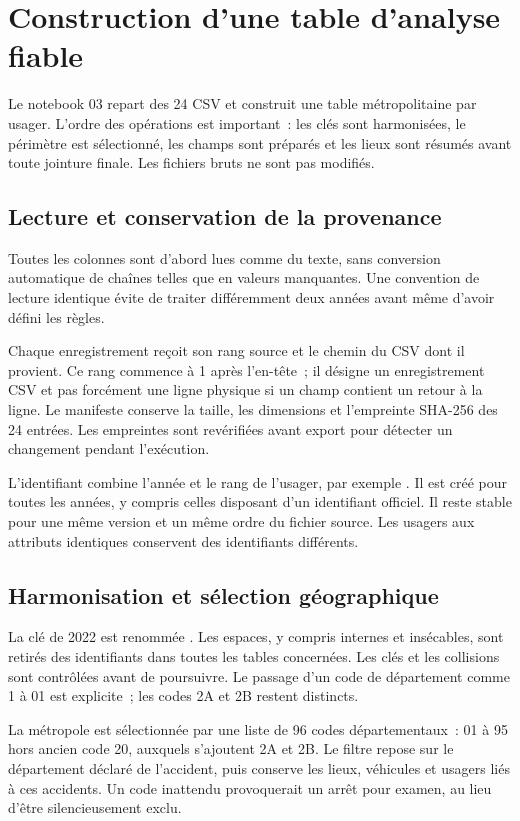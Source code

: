 \chapter{Construction d'une table d'analyse fiable}
\label{chap:preparation}

Le notebook 03 repart des 24 CSV et construit une table métropolitaine par usager.
L'ordre des opérations est important~: les clés sont harmonisées, le périmètre est
sélectionné, les champs sont préparés et les lieux sont résumés avant toute jointure
finale. Les fichiers bruts ne sont pas modifiés.

\section{Lecture et conservation de la provenance}
Toutes les colonnes sont d'abord lues comme du texte, sans conversion automatique de
chaînes telles que  en valeurs manquantes. Une convention de lecture identique
évite de traiter différemment deux années avant même d'avoir défini les règles.

Chaque enregistrement reçoit son rang source et le chemin du CSV dont il provient.
Ce rang commence à 1 après l'en-tête~; il désigne un enregistrement CSV et pas forcément
une ligne physique si un champ contient un retour à la ligne. Le manifeste conserve
la taille, les dimensions et l'empreinte SHA-256 des 24 entrées. Les empreintes sont
revérifiées avant export pour détecter un changement pendant l'exécution.

L'identifiant  combine l'année et le rang de l'usager, par exemple
. Il est créé pour toutes les années, y compris celles disposant
d'un identifiant officiel. Il reste stable pour une même version et un même ordre du
fichier source. Les usagers aux attributs identiques conservent des identifiants différents.

\section{Harmonisation et sélection géographique}
La clé  de 2022 est renommée . Les espaces, y compris
internes et insécables, sont retirés des identifiants dans toutes les tables concernées.
Les clés et les collisions sont contrôlées avant de poursuivre. Le passage d'un code
de département comme 1 à 01 est explicite~; les codes 2A et 2B restent distincts.

La métropole est sélectionnée par une liste de 96 codes départementaux~: 01 à 95 hors
ancien code 20, auxquels s'ajoutent 2A et 2B. Le filtre repose sur le département déclaré
de l'accident, puis conserve les lieux, véhicules et usagers liés à ces accidents.
Un code inattendu provoquerait un arrêt pour examen, au lieu d'être silencieusement exclu.

